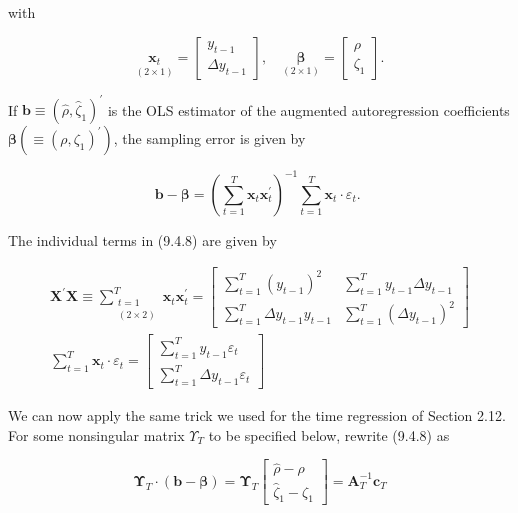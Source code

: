 \documentclass[10pt]{article}
\begin{document}
with

\[
\underset{(2 \times 1)}{\mathbf{x}_{t}}=\left[\begin{array}{c}
y_{t-1}  \tag{9.4.7}\\
\Delta y_{t-1}
\end{array}\right], \quad \underset{(2 \times 1)}{\boldsymbol{\beta}}=\left[\begin{array}{c}
\rho \\
\zeta_{1}
\end{array}\right] .
\]

If $\mathbf{b} \equiv\left(\hat{\rho}, \hat{\zeta}_{1}\right)^{\prime}$ is the OLS estimator of the augmented autoregression coefficients $\boldsymbol{\beta}\left(\equiv\left(\rho, \zeta_{1}\right)^{\prime}\right)$, the sampling error is given by


\begin{equation*}
\mathbf{b}-\boldsymbol{\beta}=\left(\sum_{t=1}^{T} \mathbf{x}_{t} \mathbf{x}_{t}^{\prime}\right)^{-1} \sum_{t=1}^{T} \mathbf{x}_{t} \cdot \varepsilon_{t} \text {. } \tag{9.4.8}
\end{equation*}


The individual terms in (9.4.8) are given by


\begin{gather*}
\mathbf{X}^{\prime} \mathbf{X} \equiv \sum_{\substack{t=1 \\
(2 \times 2)}}^{T} \mathbf{x}_{t} \mathbf{x}_{t}^{\prime}=\left[\begin{array}{cc}
\sum_{t=1}^{T}\left(y_{t-1}\right)^{2} & \sum_{t=1}^{T} y_{t-1} \Delta y_{t-1} \\
\sum_{t=1}^{T} \Delta y_{t-1} y_{t-1} & \sum_{t=1}^{T}\left(\Delta y_{t-1}\right)^{2}
\end{array}\right] \\
\sum_{t=1}^{T} \mathbf{x}_{t} \cdot \varepsilon_{t}=\left[\begin{array}{c}
\sum_{t=1}^{T} y_{t-1} \varepsilon_{t} \\
\sum_{t=1}^{T} \Delta y_{t-1} \varepsilon_{t}
\end{array}\right] \tag{9.4.9}
\end{gather*}


We can now apply the same trick we used for the time regression of Section 2.12. For some nonsingular matrix $\Upsilon_{T}$ to be specified below, rewrite (9.4.8) as

\[
\boldsymbol{\Upsilon}_{T} \cdot(\mathbf{b}-\boldsymbol{\beta})=\boldsymbol{\Upsilon}_{T}\left[\begin{array}{c}
\hat{\rho}-\rho  \tag{9.4.10}\\
\hat{\zeta}_{1}-\zeta_{1}
\end{array}\right]=\mathbf{A}_{T}^{-1} \mathbf{c}_{T}
\]
\end{document}
